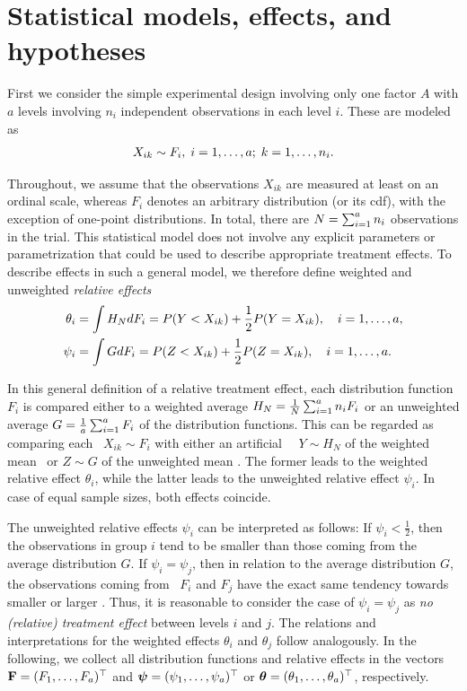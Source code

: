 \section{Statistical models, effects, and hypotheses} \label{mod}

First we consider the simple experimental design involving only one factor $A$ 
with $a$ levels involving $n_i$ independent observations in each level $i$. These are modeled as 
\begin{eqnarray}
X_{ik} \sim F_i, \; i=1,\ldots,a; \; k=1, \ldots, n_i. \label{model1}
\end{eqnarray}

Throughout, we assume that the observations $X_{ik}$ are measured at least on 
an ordinal scale, whereas $F_i$ denotes an arbitrary distribution (or its cdf), 
with the exception of one-point distributions. In total, there are $N = \sum_{i=1}^ 
a n_i$ observations in the trial. This statistical model does not involve any 
explicit parameters or parametrization that could be used to describe 
appropriate treatment effects. To describe effects in such a general model, we 
therefore define weighted and unweighted \textit{relative effects}
\begin{align} 
\theta_i &= \int H_N dF_i = P(Y<X_{ik})+\frac{1}{2}P(Y=X_{ik}), \quad i=1, \ldots, a, 
\label{thetaidef} \\
\psi_i &= \int G dF_i = P(Z<X_{ik})+\frac{1}{2}P(Z=X_{ik}), \quad i=1, \ldots, a. 
\label{psiidef}
\end{align}

In this general definition of a relative treatment effect, each distribution 
function $F_i$ is compared either to a weighted average $H_N = \frac1N \sum_{i=1}^ a 
n_i F_i$ or an unweighted average $G = \frac1a \sum_{i=1}^ a F_i$ of the distribution 
functions. This can be regarded as comparing each \obs\ $X_{ik} \sim F_i$ with 
either an artificial \ind\ \obs\ $Y \sim H_N$ of the weighted mean \db\ or $Z 
\sim G$ of the unweighted mean \db. The former leads to the weighted relative 
effect $\theta_i$, while the latter leads to the unweighted relative effect 
$\psi_i$. In case of equal sample sizes, both effects coincide. 

The unweighted relative effects $\psi_i$ can be interpreted as follows: If 
$\psi_i < \frac12$, then the observations in group $i$ tend to be smaller than 
those coming from the average distribution $G$. If $\psi_i = \psi_j$, then in 
relation to the average distribution $G$, the observations coming from \dbs\ 
$F_i$ and $F_j$ have the exact same tendency towards smaller or larger \obss. 
Thus, it is reasonable to consider the case of $\psi_i= \psi_j$ as \textit{no 
(relative) treatment effect} between levels $i$ and $j$. The relations and 
interpretations for the weighted effects $\theta_i$ and $\theta_j$ follow 
analogously. In the following, we collect all distribution functions and 
relative effects in the vectors $\mathbf{F} = (F_1,\ldots, F_a)^\top$ and $\boldsymbol{\psi} = 
(\psi_1,\ldots, \psi_a)^\top$ or $\boldsymbol{\theta} = (\theta_1, \ldots, \theta_a)^\top$, 
respectively. 

